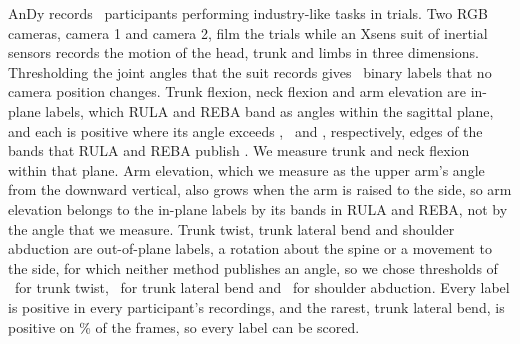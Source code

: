 \documentclass[review,3p,authoryear]{elsarticle}
\begin{document}
AnDy \citep{maurice2019andy} records \andyParticipants\ participants performing
industry-like tasks in trials. Two RGB cameras, camera 1 and camera 2, film the trials while an Xsens suit of
inertial sensors records the motion of the head, trunk and limbs in three dimensions.
Thresholding the joint angles that the suit records gives \andyNLabels\ binary labels that
no camera position changes. Trunk flexion, neck flexion and arm elevation are in-plane
labels, which RULA and REBA band as angles within the sagittal plane, and each is positive
where its angle exceeds
\andyCutTrunkFlexion\textdegree, \andyCutNeckFlexion\textdegree\ and
\andyCutArmElev\textdegree, respectively, edges of the bands that RULA and REBA publish
\citep{mcatamney1993rula,hignett2000reba}. We measure trunk and neck flexion within that
plane. Arm elevation, which we measure as the upper arm's angle from the downward vertical,
also grows when the arm is raised to the side, so arm elevation belongs to the in-plane
labels by its bands in RULA and REBA, not by the angle that we measure. Trunk twist, trunk lateral bend and shoulder
abduction are out-of-plane labels, a rotation about the spine or a movement to the side,
for which neither method publishes an angle, so we chose thresholds of
\andyCutTrunkTwist\textdegree\ for trunk twist, \andyCutTrunkLateral\textdegree\ for trunk
lateral bend and \andyCutArmAbd\textdegree\ for shoulder abduction. Every label is
positive in every participant's recordings, and the rarest, trunk lateral bend, is
positive on \andyPrevMin\% of the frames, so every label can be scored.
\end{document}
